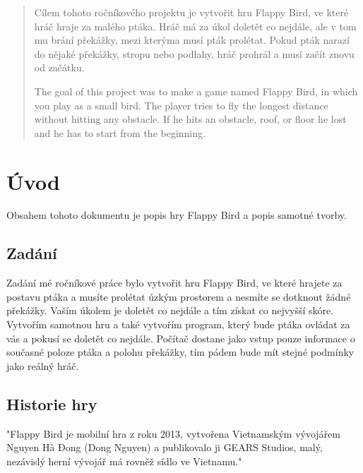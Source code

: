 \begin{abstract}
    Cílem tohoto ročníkového projektu je vytvořit hru Flappy Bird, ve které hráč hraje za malého ptáka. Hráč má za úkol doletět co nejdále, ale v tom mu brání překážky, mezi kterýma musí pták prolétat. Pokud pták narazí do nějaké překážky, stropu nebo podlahy, hráč prohrál a musí začít znovu od začátku.
    
    \hspace{}
    
    \hspace{}
    
    The goal of this project was to make a game named Flappy Bird, in which you play as a small bird. The player tries to fly the longest distance without hitting any obstacle. If he hits an obstacle, roof, or floor he lost and he has to start from the beginning.
    
\end{abstract}

\section{Úvod}

Obsahem tohoto dokumentu je popis hry Flappy Bird a popis samotné tvorby.

\subsection{Zadání}

Zadání mé ročníkové práce bylo vytvořit hru Flappy Bird, ve které hrajete za postavu ptáka a musíte prolétat úzkým prostorem a nesmíte se dotknout žádné překážky. Vaším úkolem je doletět co nejdále a tím získat co nejvyšší skóre. 
Vytvořím samotnou hru a také vytvořím program, který bude ptáka ovládat za vás a pokusí se doletět co nejdále. Počítač dostane jako vstup pouze informace o současné poloze ptáka a polohu překážky, tím pádem bude mít stejné podmínky jako reálný hráč.

\subsection{Historie hry}
"Flappy Bird je mobilní hra z roku 2013, vytvořena Vietnamským vývojářem Nguyen Hà Đong (Dong Nguyen) a publikovalo ji GEARS Studios, malý, nezávislý herní vývojář má rovněž sídlo ve Vietnamu."\cite{historie}